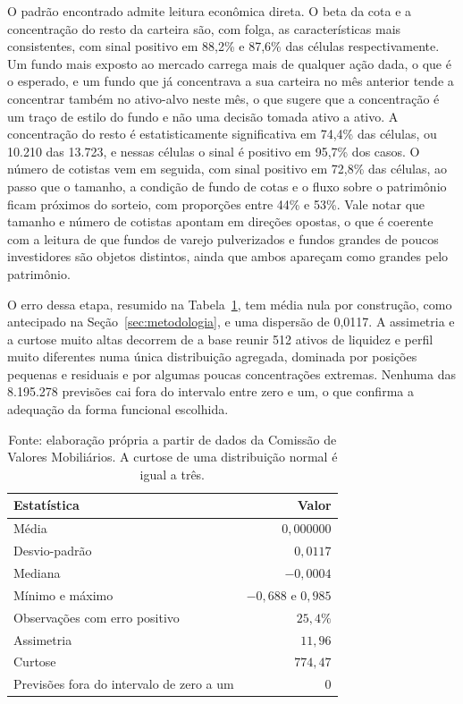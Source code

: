 \documentclass[12pt,a4paper]{article}
\begin{document}
O padrão encontrado admite leitura econômica direta. O beta da cota e a concentração do resto da
carteira são, com folga, as características mais consistentes, com sinal positivo em 88,2\% e
87,6\% das células respectivamente. Um fundo mais exposto ao mercado carrega mais de qualquer
ação dada, o que é o esperado, e um fundo que já concentrava a sua carteira no mês anterior
tende a concentrar também no ativo-alvo neste mês, o que sugere que a concentração é um traço
de estilo do fundo e não uma decisão tomada ativo a ativo. A concentração do resto é
estatisticamente significativa em 74,4\% das células, ou 10.210 das 13.723, e nessas células
o sinal é positivo em 95,7\% dos casos. O número de cotistas vem em seguida, com sinal
positivo em 72,8\% das células, ao passo que o tamanho, a condição de fundo de cotas e o
fluxo sobre o patrimônio ficam próximos do sorteio, com proporções entre 44\% e 53\%. Vale
notar que tamanho e número de cotistas apontam em direções opostas, o que é coerente com a
leitura de que fundos de varejo pulverizados e fundos grandes de poucos investidores são
objetos distintos, ainda que ambos apareçam como grandes pelo patrimônio.

O erro dessa etapa, resumido na Tabela~\ref{tab:erro-e}, tem média nula por construção, como
antecipado na Seção~\ref{sec:metodologia}, e uma dispersão de 0,0117. A assimetria e a
curtose muito altas decorrem de a base reunir 512 ativos de liquidez e perfil muito
diferentes numa única distribuição agregada, dominada por
posições pequenas e residuais e por algumas poucas concentrações extremas. Nenhuma das
8.195.278 previsões cai fora do intervalo entre zero e um, o que confirma a adequação da
forma funcional escolhida.

\begin{table}[h]\centering\small
\caption{Estatísticas do erro da primeira etapa, em 8.195.278 observações.}
\label{tab:erro-e}
\begin{tabular}{@{}lr@{}}
\toprule
Estatística & Valor \\
\midrule
Média & $0{,}000000$ \\
Desvio-padrão & $0{,}0117$ \\
Mediana & $-0{,}0004$ \\
Mínimo e máximo & $-0{,}688$ e $0{,}985$ \\
Observações com erro positivo & $25{,}4\%$ \\
Assimetria & $11{,}96$ \\
Curtose & $774{,}47$ \\
Previsões fora do intervalo de zero a um & $0$ \\
\bottomrule
\end{tabular}
\caption*{\footnotesize Fonte: elaboração própria a partir de dados da Comissão de Valores
Mobiliários. A curtose de uma distribuição normal é igual a três.}
\end{table}
\end{document}
